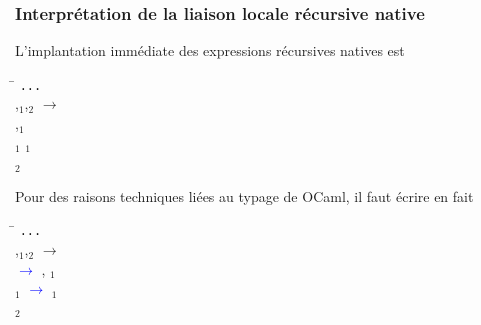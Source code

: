 %
\begin{frame}
\frametitle{Interprétation de la liaison locale récursive native}

L'implantation immédiate des expressions récursives natives est

{\small
 \begin{tabbing}
 \Xlet \= \Xrec {}   \equal
 \Xmatch {} \Xwith \texttt{...} \\
 \vbar \>  \lpar{},$_1$,$_2$\rpar{}
 $\rightarrow$\\
 \> \quad \Xlet \Xrec {} \equal {} 
 \lpar{},$_1$\rpar \qquad {}\\
 \> \quad \Xand {}$_1$ \equal {}  $_1$
 \qquad {}\\
 \> \quad \Xin {}  $_2$ \qquad
 \end{tabbing}
}

Pour des raisons techniques liées au typage de OCaml, il faut écrire
en fait

{\small
 \begin{tabbing}
 \Xlet \= \Xrec {}   \equal
 \Xmatch {} \Xwith \texttt{...} \\
 \vbar \> 
 \lpar{},$_1$,$_2$\rpar{} $\rightarrow$\\
 \> \quad \Xlet \Xrec {} \equal \textcolor{blue}{\Xfun
  $\rightarrow$}  
 \lpar{}, $_1$\textcolor{blue}{\lpar\rpar}\rpar{} \textcolor{blue}{}\\
 \> \quad \Xand {}$_1$ \equal \textcolor{blue}{\Xfun \lpar\rpar{}
 $\rightarrow$}   $_1$\\
 \> \quad \Xin {}  $_2$
 \end{tabbing}
}

\end{frame}

